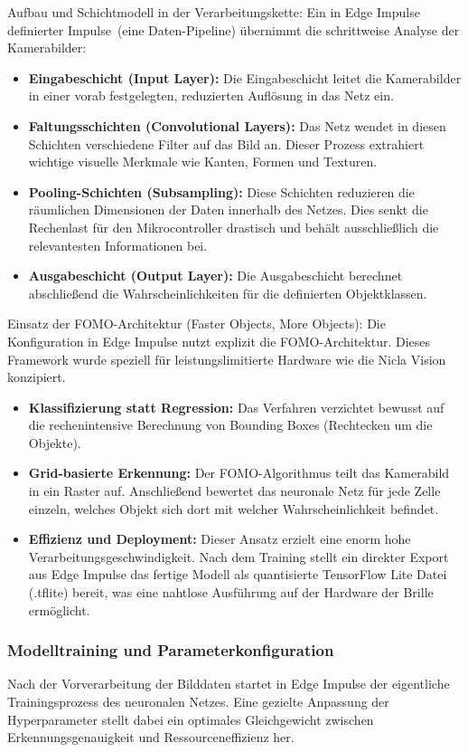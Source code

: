 Aufbau und Schichtmodell in der Verarbeitungskette: Ein in Edge Impulse definierter \glqq Impulse\grqq\ (eine Daten-Pipeline) übernimmt die schrittweise Analyse der Kamerabilder:
\begin{itemize}
    \item \textbf{Eingabeschicht (Input Layer):} Die Eingabeschicht leitet die Kamerabilder in einer vorab festgelegten, reduzierten Auflösung in das Netz ein.
    \item \textbf{Faltungsschichten (Convolutional Layers):} Das Netz wendet in diesen Schichten verschiedene Filter auf das Bild an. Dieser Prozess extrahiert wichtige visuelle Merkmale wie Kanten, Formen und Texturen.
    \item \textbf{Pooling-Schichten (Subsampling):} Diese Schichten reduzieren die räumlichen Dimensionen der Daten innerhalb des Netzes. Dies senkt die Rechenlast für den Mikrocontroller drastisch und behält ausschließlich die relevantesten Informationen bei.
    \item \textbf{Ausgabeschicht (Output Layer):} Die Ausgabeschicht berechnet abschließend die Wahrscheinlichkeiten für die definierten Objektklassen.
\end{itemize}

Einsatz der FOMO-Architektur (Faster Objects, More Objects): Die Konfiguration in Edge Impulse nutzt explizit die FOMO-Architektur. Dieses Framework wurde speziell für leistungslimitierte Hardware wie die Nicla Vision konzipiert.
\begin{itemize}
    \item \textbf{Klassifizierung statt Regression:} Das Verfahren verzichtet bewusst auf die rechenintensive Berechnung von Bounding Boxes (Rechtecken um die Objekte).
    \item \textbf{Grid-basierte Erkennung:} Der FOMO-Algorithmus teilt das Kamerabild in ein Raster auf. Anschließend bewertet das neuronale Netz für jede Zelle einzeln, welches Objekt sich dort mit welcher Wahrscheinlichkeit befindet.
    \item \textbf{Effizienz und Deployment:} Dieser Ansatz erzielt eine enorm hohe Verarbeitungsgeschwindigkeit. Nach dem Training stellt ein direkter Export aus Edge Impulse das fertige Modell als quantisierte TensorFlow Lite Datei (.tflite) bereit, was eine nahtlose Ausführung auf der Hardware der Brille ermöglicht.
\end{itemize}

\subsubsection*{Modelltraining und Parameterkonfiguration}
Nach der Vorverarbeitung der Bilddaten startet in Edge Impulse der eigentliche Trainingsprozess des neuronalen Netzes. Eine gezielte Anpassung der Hyperparameter stellt dabei ein optimales Gleichgewicht zwischen Erkennungsgenauigkeit und Ressourceneffizienz her.

